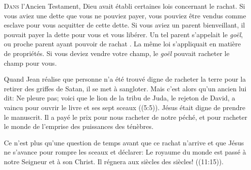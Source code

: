 \dvrule







\lettrine{D}{ans} l'Ancien Testament,
 Dieu avait établi certaines lois concernant le rachat.
 Si vous aviez une dette que vous ne pouviez payer,
 vous pouviez être vendus comme esclave pour vous acquitter
 de cette dette. Si vous aviez un parent bienveillant,
 il pouvait payer la dette pour vous et vous libérer.
 Un tel parent s'appelait le \emph{goël}, 
 ou \Og proche parent ayant pouvoir de rachat \Fg{}.
 La même loi s'appliquait en matière de propriétés.
 Si vous deviez vendre votre champ, le \emph{goël}
 pouvait racheter le champ pour vous. 

Quand Jean réalise que personne n'a été trouvé digne de racheter
 la terre pour la retirer des griffes de Satan, il se met à sangloter.
 Mais c'est alors qu'un ancien lui dit: 
 \Og Ne pleure pas; voici que le lion de la tribu de Juda,
 le rejeton de David, a vaincu pour ouvrir le livre et ses sept sceaux \Fg{}
 ((5:5)).
 Jésus était digne de prendre le manuscrit. Il a payé le prix
 pour nous racheter de notre péché, et pour racheter le monde
 de l'emprise des puissances des ténèbres. 


Ce n'est plus qu'une question de temps avant que ce rachat n'arrive
 et que Jésus ne s'avance pour rompre les sceaux et déclarer: 
 \Og Le royaume du monde est passé à notre Seigneur et à son Christ.
 Il régnera aux siècles des siècles! \Fg{} ((11:15)). 

\dvrule



